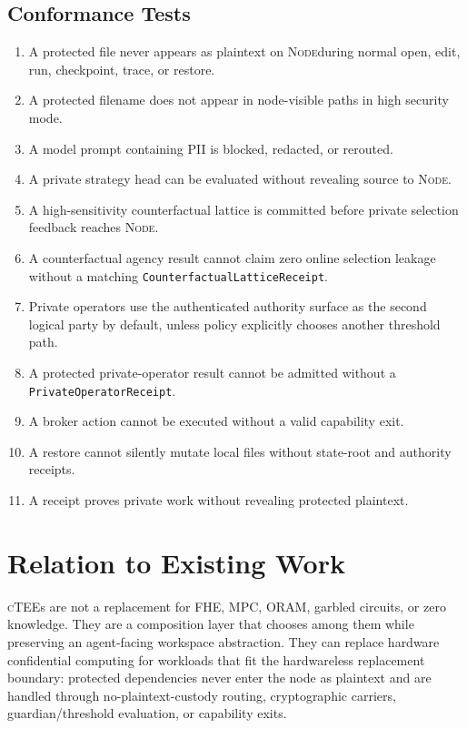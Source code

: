 \documentclass[11pt]{article}
\newcommand{\ctee}{\textnormal{\textsc{cTEE}}}
\newcommand{\roletext}[1]{\textnormal{\textsc{#1}}\xspace}
\newcommand{\node}{\ifmmode\mathsf{Node}\else\roletext{Node}\fi}
\newcommand{\code}[1]{\texttt{#1}}
\begin{document}
\subsection{Conformance Tests}

\begin{enumerate}[leftmargin=1.5em]
\item A protected file never appears as plaintext on \node during normal open,
edit, run, checkpoint, trace, or restore.
\item A protected filename does not appear in node-visible paths in high
security mode.
\item A model prompt containing PII is blocked, redacted, or rerouted.
\item A private strategy head can be evaluated without revealing source to
\node.
\item A high-sensitivity counterfactual lattice is committed before private
selection feedback reaches \node.
\item A counterfactual agency result cannot claim zero online selection leakage
without a matching \code{CounterfactualLatticeReceipt}.
\item Private operators use the authenticated authority surface as the second
logical party by default, unless policy explicitly chooses another threshold
path.
\item A protected private-operator result cannot be admitted without a
\code{PrivateOperatorReceipt}.
\item A broker action cannot be executed without a valid capability exit.
\item A restore cannot silently mutate local files without state-root and
authority receipts.
\item A receipt proves private work without revealing protected plaintext.
\end{enumerate}

\section{Relation to Existing Work}

\ctee{}s are not a replacement for FHE, MPC, ORAM, garbled circuits, or zero
knowledge. They are a composition layer that chooses among them while
preserving an agent-facing workspace abstraction. They can replace hardware
confidential computing for workloads that fit the hardwareless replacement
boundary: protected dependencies never enter the node as plaintext and are
handled through no-plaintext-custody routing, cryptographic carriers,
guardian/threshold evaluation, or capability exits.
\end{document}
